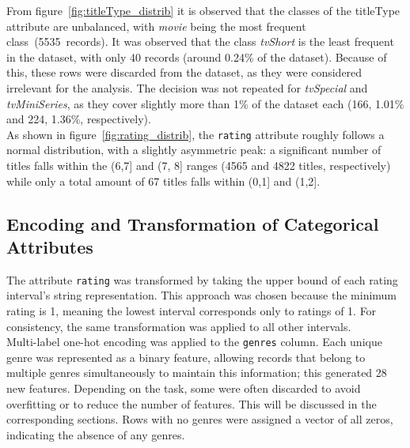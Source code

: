 From figure~\ref{fig:titleType_distrib} it is observed that the classes of the titleType attribute are unbalanced, with \textit{movie} being the most frequent class (5535 records).
It was observed that the class \textit{tvShort} is the least frequent in the dataset, with only 40 records (around 0.24\% of the dataset). Because of this, these rows were discarded from the dataset, as they were considered irrelevant for the analysis.
The decision was not repeated for \textit{tvSpecial} and \textit{tvMiniSeries}, as they cover slightly more than 1\% of the dataset each (166, 1.01\% and 224, 1.36\%, respectively). \\

As shown in figure~\ref{fig:rating_distrib}, the \texttt{rating} attribute roughly follows a normal distribution, with a slightly asymmetric peak:
a significant number of titles falls within the (6,7] and (7, 8] ranges (4565 and 4822 titles, respectively) while only a total amount of 67 titles falls within (0,1] and (1,2].


\subsection{Encoding and Transformation of Categorical Attributes}
The attribute \texttt{rating} was transformed by taking the upper bound of each rating
interval's string representation. This approach was chosen because the minimum rating is 1, meaning the
lowest interval corresponds only to ratings of 1. For consistency, the same transformation was applied
to all other intervals.\\

Multi-label one-hot encoding was applied to the \texttt{genres} column. 
Each unique genre was represented as a binary feature, allowing records that belong to multiple genres simultaneously to maintain this information; this generated 28 new features.
Depending on the task, some were often discarded to avoid overfitting or to reduce the number of features.
This will be discussed in the corresponding sections.
Rows with no genres were assigned a vector of all zeros, indicating the absence of any genres.\\

